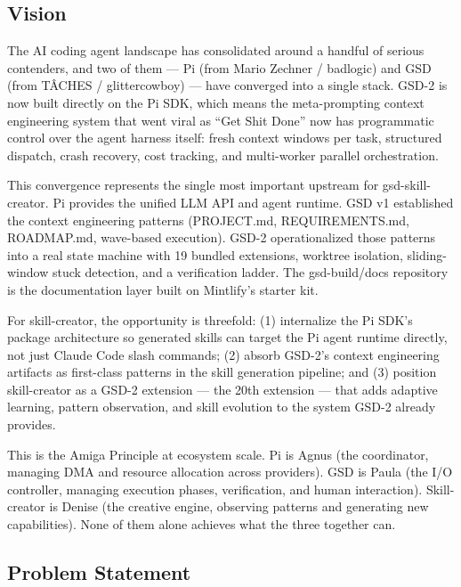 \documentclass[11pt,letterpaper]{article}
\begin{document}
\subsection{Vision}

The AI coding agent landscape has consolidated around a handful of serious contenders, and two of them --- Pi (from Mario Zechner / badlogic) and GSD (from T\^ACHES / glittercowboy) --- have converged into a single stack. GSD-2 is now built directly on the Pi SDK, which means the meta-prompting context engineering system that went viral as ``Get Shit Done'' now has programmatic control over the agent harness itself: fresh context windows per task, structured dispatch, crash recovery, cost tracking, and multi-worker parallel orchestration.

This convergence represents the single most important upstream for gsd-skill-creator. Pi provides the unified LLM API and agent runtime. GSD v1 established the context engineering patterns (PROJECT.md, REQUIREMENTS.md, ROADMAP.md, wave-based execution). GSD-2 operationalized those patterns into a real state machine with 19 bundled extensions, worktree isolation, sliding-window stuck detection, and a verification ladder. The gsd-build/docs repository is the documentation layer built on Mintlify's starter kit.

For skill-creator, the opportunity is threefold: (1) internalize the Pi SDK's package architecture so generated skills can target the Pi agent runtime directly, not just Claude Code slash commands; (2) absorb GSD-2's context engineering artifacts as first-class patterns in the skill generation pipeline; and (3) position skill-creator as a GSD-2 extension --- the 20th extension --- that adds adaptive learning, pattern observation, and skill evolution to the system GSD-2 already provides.

This is the Amiga Principle at ecosystem scale. Pi is Agnus (the coordinator, managing DMA and resource allocation across providers). GSD is Paula (the I/O controller, managing execution phases, verification, and human interaction). Skill-creator is Denise (the creative engine, observing patterns and generating new capabilities). None of them alone achieves what the three together can.

\subsection{Problem Statement}
\end{document}
